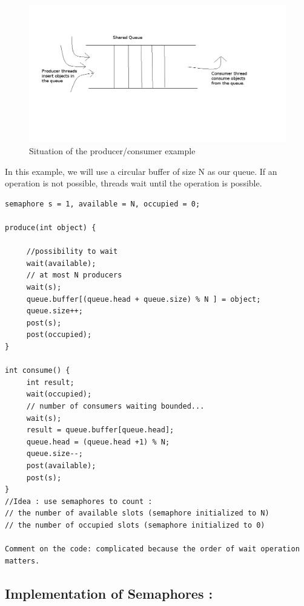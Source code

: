 \documentclass[a4paper,10pt]{article}
\begin{document}
\begin{figure}
  \begin{center}
    \includegraphics[scale=0.5]{shared_queue.png}
    \caption{Situation of the producer/consumer example}
    \label{}
  \end{center}
\end{figure}

In this example, we will use a circular buffer of size N as our queue.
If an operation is not possible, threads wait until the operation is possible.
\begin{verbatim}
semaphore s = 1, available = N, occupied = 0;

produce(int object) {

     //possibility to wait
     wait(available);
     // at most N producers
     wait(s);
     queue.buffer[(queue.head + queue.size) % N ] = object;
     queue.size++;
     post(s);
     post(occupied);
}

int consume() {
     int result;
     wait(occupied);
     // number of consumers waiting bounded...
     wait(s);
     result = queue.buffer[queue.head];
     queue.head = (queue.head +1) % N;
     queue.size--;
     post(available);
     post(s);
}
//Idea : use semaphores to count :
// the number of available slots (semaphore initialized to N)
// the number of occupied slots (semaphore initialized to 0)

Comment on the code: complicated because the order of wait operation matters.
\end{verbatim}



\subsection{Implementation of Semaphores :}
\end{document}
